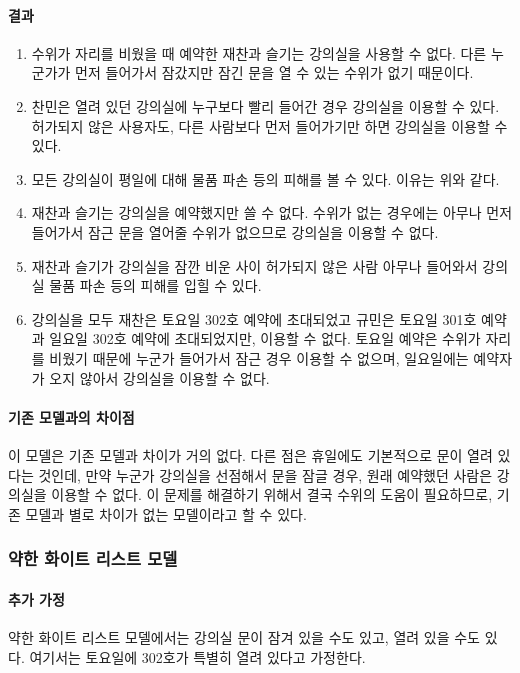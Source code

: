 \documentclass[11pt,a4paper]{article}
\begin{document}
\paragraph{결과}
\begin{enumerate}
\item 수위가 자리를 비웠을 때 예약한 재찬과 슬기는 강의실을 사용할 수 없다. 다른 누군가가 먼저 들어가서 잠갔지만 잠긴 문을 열 수 있는 수위가 없기 때문이다.
\item 찬민은 열려 있던 강의실에 누구보다 빨리 들어간 경우 강의실을 이용할 수 있다. 허가되지 않은 사용자도, 다른 사람보다 먼저 들어가기만 하면 강의실을 이용할 수 있다.
\item 모든 강의실이 평일에 대해 물품 파손 등의 피해를 볼 수 있다. 이유는 위와 같다.
\item 재찬과 슬기는 강의실을 예약했지만 쓸 수 없다. 수위가 없는 경우에는 아무나 먼저 들어가서 잠근 문을 열어줄 수위가 없으므로 강의실을 이용할 수 없다.
\item 재찬과 슬기가 강의실을 잠깐 비운 사이 허가되지 않은 사람 아무나 들어와서 강의실 물품 파손 등의 피해를 입힐 수 있다.
\item 강의실을 모두 재찬은 토요일 302호 예약에 초대되었고 규민은 토요일 301호 예약과 일요일 302호 예약에 초대되었지만, 이용할 수 없다. 토요일 예약은 수위가 자리를 비웠기 때문에 누군가 들어가서 잠근 경우 이용할 수 없으며, 일요일에는 예약자가 오지 않아서 강의실을 이용할 수 없다.
\end{enumerate}

\paragraph{기존 모델과의 차이점}
\hfill\break
이 모델은 기존 모델과 차이가 거의 없다. 다른 점은 휴일에도 기본적으로 문이 열려 있다는 것인데, 만약 누군가 강의실을 선점해서 문을 잠글 경우, 원래 예약했던 사람은 강의실을 이용할 수 없다. 이 문제를 해결하기 위해서 결국 수위의 도움이 필요하므로, 기존 모델과 별로 차이가 없는 모델이라고 할 수 있다.

\subsubsection{약한 화이트 리스트 모델}

\paragraph{추가 가정}
약한 화이트 리스트 모델에서는 강의실 문이 잠겨 있을 수도 있고, 열려 있을 수도 있다. 여기서는 토요일에 302호가 특별히 열려 있다고 가정한다.
\end{document}

